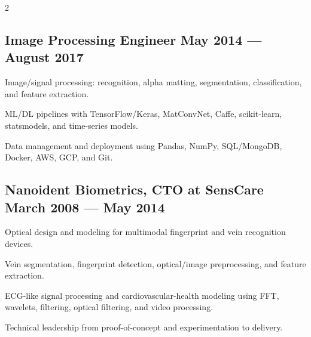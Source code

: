 \begin{multicols}{2}
\subsection{Image Processing Engineer \hfill May 2014 --- August 2017}
\begin{zitemize}
\item Image/signal processing: recognition, alpha matting, segmentation, classification, and feature extraction.
\item ML/DL pipelines with TensorFlow/Keras, MatConvNet, Caffe, scikit-learn, statsmodels, and time-series models.
\item Data management and deployment using Pandas, NumPy, SQL/MongoDB, Docker, AWS, GCP, and Git.
\end{zitemize}

\subsection{Nanoident Biometrics, CTO at SensCare \hfill March 2008 --- May 2014}
\begin{zitemize}
\item Optical design and modeling for multimodal fingerprint and vein recognition devices.
\item Vein segmentation, fingerprint detection, optical/image preprocessing, and feature extraction.
\item ECG-like signal processing and cardiovascular-health modeling using FFT, wavelets, filtering, optical filtering, and video processing.
\item Technical leadership from proof-of-concept and experimentation to delivery.
\end{zitemize}
\end{multicols}


